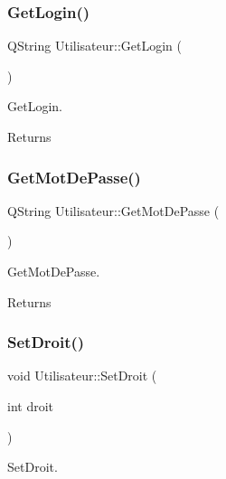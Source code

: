 \subsubsection{\texorpdfstring{Get\+Login()}{GetLogin()}}
{\footnotesize\ttfamily Q\+String Utilisateur\+::\+Get\+Login (\begin{DoxyParamCaption}{ }\end{DoxyParamCaption})}



Get\+Login. 

\begin{DoxyReturn}{Returns}

\end{DoxyReturn}
\mbox{\label{class_utilisateur_ad558f2e85090c4660e97e6de6f8d1567}} 
\subsubsection{\texorpdfstring{Get\+Mot\+De\+Passe()}{GetMotDePasse()}}
{\footnotesize\ttfamily Q\+String Utilisateur\+::\+Get\+Mot\+De\+Passe (\begin{DoxyParamCaption}{ }\end{DoxyParamCaption})}



Get\+Mot\+De\+Passe. 

\begin{DoxyReturn}{Returns}

\end{DoxyReturn}
\mbox{\label{class_utilisateur_ab1d22e4a620262b9ea352b53872d855c}} 
\subsubsection{\texorpdfstring{Set\+Droit()}{SetDroit()}}
{\footnotesize\ttfamily void Utilisateur\+::\+Set\+Droit (\begin{DoxyParamCaption}\item[{int}]{droit }\end{DoxyParamCaption})}



Set\+Droit. 


